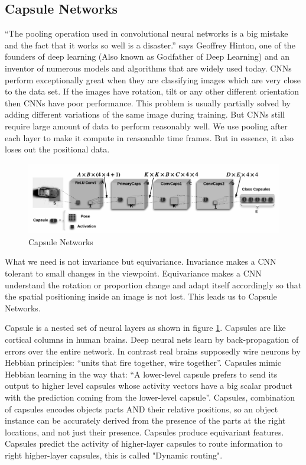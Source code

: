 \documentclass{vldb}
\begin{document}
\subsection{Capsule Networks} %
\label{sec:capsule_networks}
“The pooling operation used in convolutional neural networks is a big mistake and the fact that it works so well is a disaster.” says Geoffrey Hinton, one of the founders of deep learning (Also known as Godfather of Deep Learning) and an inventor of numerous models and algorithms that are widely used today. CNNs perform exceptionally great when they are classifying images which are very close to the data set. If the images have rotation, tilt or any other different orientation then CNNs have poor performance. This problem is usually partially solved by adding different variations of the same image during training. But CNNs still require large amount of data to perform reasonably well. We use pooling after each layer to make it compute in reasonable time frames. But in essence, it also loses out the positional data.\par\bigskip
\begin{figure}[H]
\centering\includegraphics[width=\linewidth]{../Final_Report/images/caps.png}
\caption{Capsule Networks}
\label{fig:caps}
\end{figure}
What we need is not invariance but equivariance. Invariance makes a CNN tolerant to small changes in the viewpoint. Equivariance makes a CNN understand the rotation or proportion change and adapt itself accordingly so that the spatial positioning inside an image is not lost. This leads us to Capsule Networks.\par\bigskip
Capsule is a nested set of neural layers as shown in figure \ref{fig:caps}. Capsules are like cortical columns in human brains. Deep neural nets learn by back-propagation of errors over the entire network. In contrast real brains supposedly wire neurons by Hebbian principles: “units that fire together, wire together”. Capsules mimic Hebbian learning in the way that: “A lower-level capsule prefers to send its output to higher level capsules whose activity vectors have a big scalar product with the prediction coming from the lower-level capsule”. Capsules, combination of capsules encodes objects parts AND their relative positions, so an object instance can be accurately derived from the presence of the parts at the right locations, and not just their presence. Capsules produce equivariant features. Capsules predict the activity of higher-layer capsules to route information to right higher-layer capsules, this is called "Dynamic routing".
\end{document}
